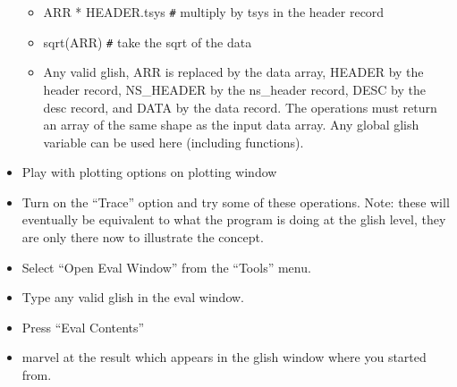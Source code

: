 \begin{itemize}
\begin{itemize}
\item ARR * HEADER.tsys  \verb_#_ multiply by tsys in the header record
\item sqrt(ARR) \verb_#_ take the sqrt of the data
\item Any valid glish, ARR is replaced by the data array, HEADER by
the header record, NS\_HEADER by the ns\_header record, DESC by the 
desc record, and DATA by the data record.  The operations must return
an array of the same shape as the input data array.  Any global glish
variable can be used here (including functions).
\end{itemize}
\item Play with plotting options on plotting window
\item Turn on the ``Trace'' option and try some of these operations.
Note: these will eventually be equivalent to what the program is doing
at the glish level, they are only there now to illustrate the concept.
\item Select ``Open Eval Window'' from the ``Tools'' menu.
\item Type any valid glish in the eval window.
\item Press ``Eval Contents''
\item marvel at the result which appears in the glish window where you
started from.
\end{itemize}
